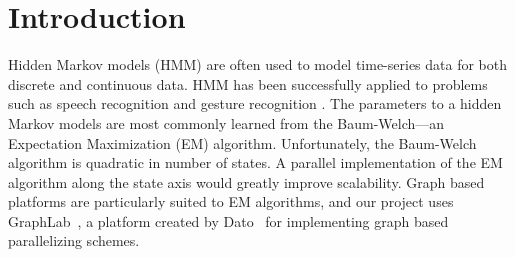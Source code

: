 \section{Introduction}

Hidden Markov models (HMM) are often used to model time-series data for both
discrete and continuous data. HMM has been successfully applied to problems such as speech recognition \cite{hmm-speech} and gesture recognition \cite{hmm-gesture}. The
parameters to a hidden Markov models are most commonly learned from the
Baum-Welch---an Expectation Maximization (EM) algorithm. Unfortunately, the
Baum-Welch algorithm is quadratic in number of states. A parallel implementation
of the EM algorithm along the state axis would greatly improve scalability.
Graph based platforms are particularly suited to EM algorithms, and our project
uses GraphLab~\cite{graphlab}, a platform created by Dato~\cite{dato} for implementing graph based parallelizing schemes. 
